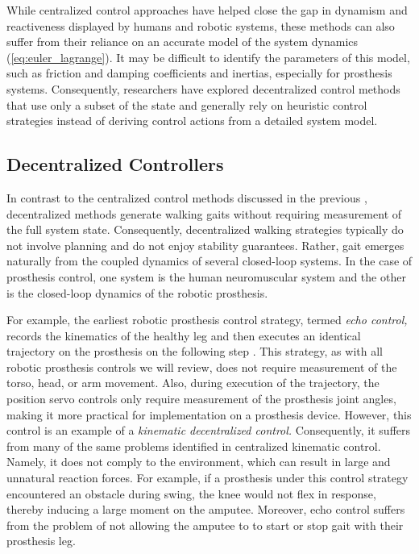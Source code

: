 While centralized control approaches have helped close the gap in dynamism and
reactiveness displayed by humans and robotic systems, these methods can also
suffer from their reliance on an accurate model of the system dynamics
(\cref{eq:euler_lagrange}). It may be difficult to identify the parameters of
this model, such as friction and damping coefficients and inertias, especially
for prosthesis systems. Consequently, researchers have explored decentralized
control methods that use only a subset of the state and generally rely on
heuristic control strategies instead of deriving control actions from a detailed
system model. 

\subsection{Decentralized Controllers}\label{sec:back_decentralized_control} 
In contrast to the centralized control methods discussed in the previous
, decentralized methods generate walking
gaits without requiring measurement of the full system state. Consequently,
decentralized walking strategies typically do not involve
planning and do not enjoy stability guarantees. Rather,
gait emerges naturally from the coupled dynamics of several closed-loop systems.
In the case of prosthesis control, one system is the human neuromuscular
system and the other is the closed-loop dynamics of the robotic prosthesis.

For example, the earliest robotic prosthesis control strategy, termed \emph{echo
control,} records the kinematics of the healthy leg and then executes an
identical trajectory on the prosthesis on the following step
\citep{grimes1977feasibility, grimes1979active}. This strategy, as with all
robotic prosthesis controls we will review, does not require measurement of the
torso, head, or arm movement. Also, during execution of the trajectory, the
position servo controls only require measurement of the prosthesis joint angles,
making it more practical for implementation on a prosthesis device. However,
this control is an example of a \emph{kinematic decentralized control.}
Consequently, it suffers from many of the same problems identified in
centralized kinematic control. Namely, it does not comply to the environment,
which can result in large and unnatural reaction forces. For example, if a
prosthesis under this control strategy encountered an obstacle during swing, the
knee would not flex in response, thereby inducing a large moment on the amputee.
Moreover, echo control suffers from the problem of not allowing the amputee to
to start or stop gait with their prosthesis leg.

